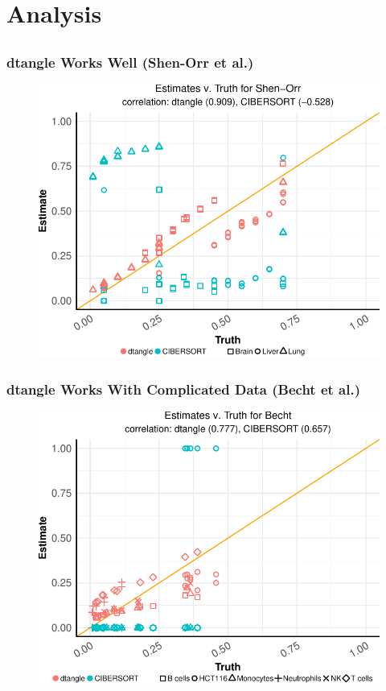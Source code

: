 \documentclass[usenames,dvipsnames,15pt]{beamer}
\begin{document}
\setcounter{subsection}{0}
\section{Analysis}
\subsection{}

\begin{frame}
  \frametitle{dtangle Works Well (Shen-Orr et al.)}
  \begin{figure}
   \hspace*{-1cm}
  \includegraphics[scale=.75]{pictures/Shen-Orr_scatter.pdf}
  \end{figure}
\end{frame}


\begin{frame}
  \frametitle{dtangle Works With Complicated Data (Becht et al.)}
  \begin{figure}
   \hspace*{-1cm}
  \includegraphics[scale=.75]{pictures/Becht_scatter.pdf}
  \end{figure}
\end{frame}
\end{document}
